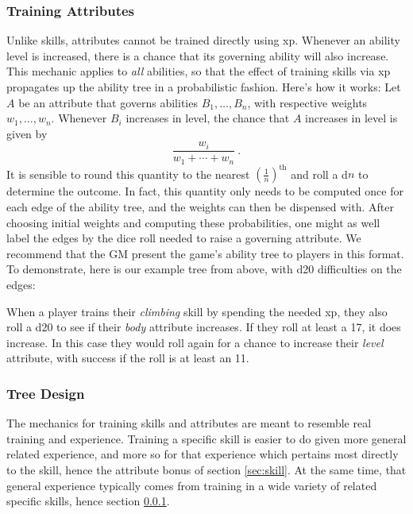 \documentclass[12pt]{article}
\begin{document}
\subsubsection{Training Attributes}\label{sec:att}
Unlike skills, attributes cannot be trained directly using xp.
Whenever an ability level is increased, there is a chance that its governing ability will also increase.
This mechanic applies to \emph{all} abilities, so that the effect of training skills via xp
propagates up the ability tree in a probabilistic fashion.
Here's how it works:
Let $A$ be an attribute that governs abilities $B_1,\ldots,B_n$, with respective weights $w_1,\ldots, w_n$.
Whenever $B_i$ increases in level, the chance that $A$ increases in level is given by
$$\frac{w_i}{w_1+\cdots+w_n}\ .$$
It is sensible to round this quantity to the nearest $(\frac{1}{n})^\text{th}$ and roll a d$n$ to determine
the outcome.
In fact, this quantity only needs to be computed once for each edge of the ability tree,
and the weights can then be dispensed with.
After choosing initial weights and computing these probabilities,
one might as well label the edges by the dice roll needed to raise a governing attribute.
We recommend that the GM present the game's ability tree to players in this format.
To demonstrate, here is our example tree from above, with d20 difficulties on the edges:
\begin{center}

\end{center}
When a player trains their \emph{climbing} skill by spending the needed xp,
they also roll a d20 to see if their \emph{body} attribute increases.
If they roll at least a 17, it does increase.
In this case they would roll again for a chance to increase their \emph{level} attribute,
with success if the roll is at least an 11.







\subsubsection{Tree Design}
The mechanics for training skills and attributes are meant to resemble real training and experience.
Training a specific skill is easier to do given more general related experience,
and more so for that experience which pertains most directly to the skill,
hence the attribute bonus of section \ref{sec:skill}.
At the same time, that general experience typically comes from training in a wide variety of related specific skills,
hence section \ref{sec:att}.
\end{document}

